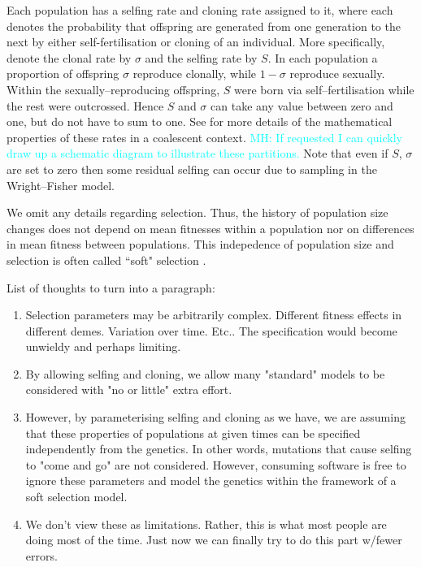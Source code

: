 \documentclass[11pt]{article}
\newcommand{\mhcomment}[1]{{\textcolor{cyan}{MH: #1}}}
\begin{document}
Each population has a selfing rate and cloning rate assigned to it, where each denotes the probability that offspring are generated from one generation to the next by either self-fertilisation or cloning of an individual. More specifically, denote the clonal rate by $\sigma$ and the selfing rate by $S$. In each population a proportion of offspring $\sigma$ reproduce clonally, while $1-\sigma$ reproduce sexually. Within the sexually--reproducing offspring, $S$ were born via self--fertilisation while the rest were outcrossed. Hence $S$ and $\sigma$ can take any value between zero and one, but do not have to sum to one. See \citet{hartfield2016facsexcoal} for more details of the mathematical properties of these rates in a coalescent context. \mhcomment{If requested I can quickly draw up a schematic diagram to illustrate these partitions.} Note that even if $S$, $\sigma$ are set to zero then some residual selfing can occur due to sampling in the Wright--Fisher model.


We omit any details regarding selection.
Thus, the history of population size changes does not depend on mean fitnesses within
a population nor on differences in mean fitness between populations.
This indepedence of population size and
selection is often called ``soft" selection \citep{christiansen1975hard}.

List of thoughts to turn into a paragraph:

\begin{enumerate}
    \item Selection parameters may be arbitrarily complex.  Different fitness effects in different demes.
          Variation over time.  Etc..
          The specification would become unwieldy and perhaps limiting.
    \item By allowing selfing and cloning, we allow many "standard" models to be considered with "no or little"
          extra effort.
    \item However, by parameterising selfing and cloning as we have, we are assuming that these properties of
          populations at given times can be specified independently from the genetics.
          In other words, mutations that cause selfing to "come and go" are not considered.
          However, consuming software is free to ignore these parameters and model the genetics within
          the framework of a soft selection model.
    \item We don't view these as limitations. Rather, this is what most people are doing most of the time.
          Just now we can finally try to do this part w/fewer errors.
\end{enumerate}
\end{document}
